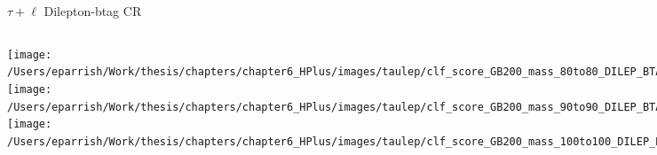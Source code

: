 \documentclass[aspectratio=169,xcolor=table]{beamer}
\begin{document}
    \begin{frame}[t]{$\tau+\ell$ Dilepton-btag CR}
      \begin{columns}[t]
          \texttt{[image: /Users/eparrish/Work/thesis/chapters/chapter6\_HPlus/images/taulep/clf\_score\_GB200\_mass\_80to80\_DILEP\_BTAG.png]}
          \texttt{[image: /Users/eparrish/Work/thesis/chapters/chapter6\_HPlus/images/taulep/clf\_score\_GB200\_mass\_90to90\_DILEP\_BTAG.png]}
          \texttt{[image: /Users/eparrish/Work/thesis/chapters/chapter6\_HPlus/images/taulep/clf\_score\_GB200\_mass\_100to100\_DILEP\_BTAG.png]}

          \texttt{[image: /Users/eparrish/Work/thesis/chapters/chapter6\_HPlus/images/taulep/clf\_score\_GB200\_mass\_110to110\_DILEP\_BTAG.png]}
          \texttt{[image: /Users/eparrish/Work/thesis/chapters/chapter6\_HPlus/images/taulep/clf\_score\_GB200\_mass\_120to120\_DILEP\_BTAG.png]}
          \texttt{[image: /Users/eparrish/Work/thesis/chapters/chapter6\_HPlus/images/taulep/clf\_score\_GB200\_mass\_130to130\_DILEP\_BTAG.png]}
          \texttt{[image: /Users/eparrish/Work/thesis/chapters/chapter6\_HPlus/images/taulep/clf\_score\_GB200\_mass\_140to140\_DILEP\_BTAG.png]}
          \texttt{[image: /Users/eparrish/Work/thesis/chapters/chapter6\_HPlus/images/taulep/clf\_score\_GB200\_mass\_150to150\_DILEP\_BTAG.png]}
          \texttt{[image: /Users/eparrish/Work/thesis/chapters/chapter6\_HPlus/images/taulep/clf\_score\_GB200\_mass\_160to160\_DILEP\_BTAG.png]}

          \texttt{[image: /Users/eparrish/Work/thesis/chapters/chapter6\_HPlus/images/taulep/clf\_score\_GB200\_mass\_170to170\_DILEP\_BTAG.png]}
          \texttt{[image: /Users/eparrish/Work/thesis/chapters/chapter6\_HPlus/images/taulep/clf\_score\_GB200\_mass\_180to180\_DILEP\_BTAG.png]}
          \texttt{[image: /Users/eparrish/Work/thesis/chapters/chapter6\_HPlus/images/taulep/clf\_score\_GB200\_mass\_190to190\_DILEP\_BTAG.png]}

      \end{columns}
    \end{frame}
\end{document}
